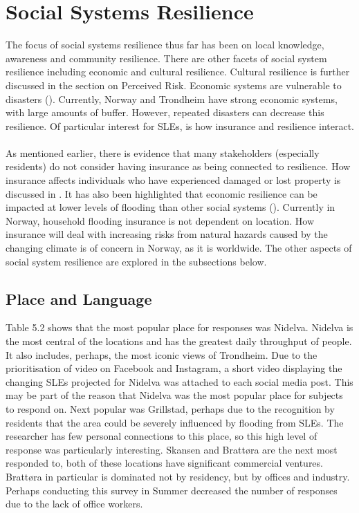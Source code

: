 \section{Social Systems Resilience}
The focus of social systems resilience thus far has been on local knowledge, awareness and community resilience. There are other facets of social system resilience including economic and cultural resilience. Cultural resilience is further discussed in the section on Perceived Risk. Economic systems are vulnerable to disasters (\cite{head_comment_2020}). Currently, Norway and Trondheim have strong economic systems, with large amounts of buffer. However, repeated disasters can decrease this resilience. Of particular interest for SLEs, is how insurance and resilience interact.
\paragraph{}
As mentioned earlier, there is evidence that many stakeholders (especially residents) do not consider having insurance as being connected to resilience. How insurance affects individuals who have experienced damaged or lost property is discussed in \cite{whitmarsh_are_2008}. It has also been highlighted that economic resilience can be impacted at lower levels of flooding than other social systems (\cite{cutter_community_2020}). Currently in Norway, household flooding insurance is not dependent on location.  How insurance will deal with increasing risks from natural hazards caused by the changing climate is of concern in Norway, as it is worldwide. The other aspects of social system resilience are explored in the subsections below.


\subsection{Place and Language}
Table 5.2 shows that the most popular place for responses was Nidelva. Nidelva is the most central of the locations and has the greatest daily throughput of people. It also includes, perhaps, the most iconic views of Trondheim. Due to the prioritisation of video on Facebook and Instagram, a short video displaying the changing SLEs projected for Nidelva was attached to each social media post. This may be part of the reason that Nidelva was the most popular place for subjects to respond on.  Next popular was Grillstad, perhaps due to the recognition by residents that the area could be severely influenced by flooding from SLEs. The researcher has few personal connections to this place, so this high level of response was particularly interesting. Skansen and Brattøra are the next most responded to, both of these locations have significant commercial ventures. Brattøra in particular is dominated not by residency, but by offices and industry. Perhaps conducting this survey in Summer decreased the number of responses due to the lack of office workers. 
